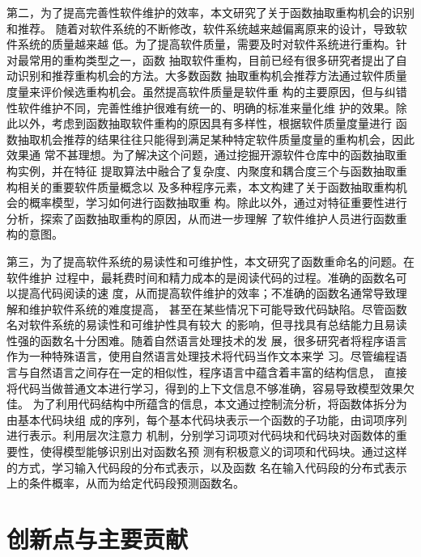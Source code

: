 第二，为了提高完善性软件维护的效率，本文研究了关于函数抽取重构机会的识别和推荐。
随着对软件系统的不断修改，软件系统越来越偏离原来的设计，导致软件系统的质量越来越
低。为了提高软件质量，需要及时对软件系统进行重构。针对最常用的重构类型之一，函数
抽取软件重构，目前已经有很多研究者提出了自动识别和推荐重构机会的方法。大多数函数
抽取重构机会推荐方法通过软件质量度量来评价候选重构机会。虽然提高软件质量是软件重
构的主要原因，但与纠错性软件维护不同，完善性维护很难有统一的、明确的标准来量化维
护的效果。除此以外，考虑到函数抽取软件重构的原因具有多样性，根据软件质量度量进行
函数抽取机会推荐的结果往往只能得到满足某种特定软件质量度量的重构机会，因此效果通
常不甚理想。为了解决这个问题，通过挖掘开源软件仓库中的函数抽取重构实例，并在特征
提取算法中融合了复杂度、内聚度和耦合度三个与函数抽取重构相关的重要软件质量概念以
及多种程序元素，本文构建了关于函数抽取重构机会的概率模型，学习如何进行函数抽取重
构。除此以外，通过对特征重要性进行分析，探索了函数抽取重构的原因，从而进一步理解
了软件维护人员进行函数重构的意图。

第三，为了提高软件系统的易读性和可维护性，本文研究了函数重命名的问题。在软件维护
过程中，最耗费时间和精力成本的是阅读代码的过程。准确的函数名可以提高代码阅读的速
度，从而提高软件维护的效率；不准确的函数名通常导致理解和维护软件系统的难度提高，
甚至在某些情况下可能导致代码缺陷。尽管函数名对软件系统的易读性和可维护性具有较大
的影响，但寻找具有总结能力且易读性强的函数名十分困难。随着自然语言处理技术的发
展，很多研究者将程序语言作为一种特殊语言，使用自然语言处理技术将代码当作文本来学
习。尽管编程语言与自然语言之间存在一定的相似性，程序语言中蕴含着丰富的结构信息，
直接将代码当做普通文本进行学习，得到的上下文信息不够准确，容易导致模型效果欠佳。
为了利用代码结构中所蕴含的信息，本文通过控制流分析，将函数体拆分为由基本代码块组
成的序列，每个基本代码块表示一个函数的子功能，由词项序列进行表示。利用层次注意力
机制，分别学习词项对代码块和代码块对函数体的重要性，使得模型能够识别出对函数名预
测有积极意义的词项和代码块。通过这样的方式，学习输入代码段的分布式表示，以及函数
名在输入代码段的分布式表示上的条件概率，从而为给定代码段预测函数名。

\section{创新点与主要贡献}

